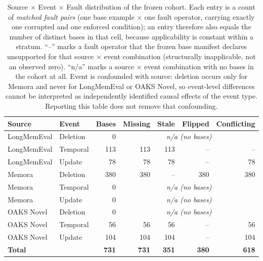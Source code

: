 \begin{table}[t]
\centering
\small
\caption{Source $\times$ Event $\times$ Fault distribution of the frozen
cohort. Each entry is a count of \emph{matched fault pairs} (one base example
$\times$ one fault operator, carrying exactly one corrupted and one enforced
condition); an entry therefore also equals the number of distinct bases in
that cell, because applicability is constant within a stratum. ``--'' marks a
fault operator that the frozen base manifest declares unsupported for that
source $\times$ event combination (structurally inapplicable, not an observed
zero). ``n/a'' marks a source $\times$ event combination with no bases in the
cohort at all. Event is confounded with source: deletion occurs only for
Memora and never for LongMemEval or OAKS Novel, so event-level differences
cannot be interpreted as independently identified causal effects of the event
type. Reporting this table does not remove that confounding.}
\label{tab:source-event-fault}
\begin{tabular}{llrrrrr}
\toprule
Source & Event & Bases & Missing & Stale & Flipped & Conflicting \\
\midrule
LongMemEval & Deletion & 0 & \multicolumn{4}{c}{\textit{n/a (no bases)}} \\
LongMemEval & Temporal & 113 & 113 & 113 & -- & -- \\
LongMemEval & Update & 78 & 78 & 78 & -- & 78 \\
\midrule
Memora & Deletion & 380 & 380 & -- & 380 & 380 \\
Memora & Temporal & 0 & \multicolumn{4}{c}{\textit{n/a (no bases)}} \\
Memora & Update & 0 & \multicolumn{4}{c}{\textit{n/a (no bases)}} \\
\midrule
OAKS Novel & Deletion & 0 & \multicolumn{4}{c}{\textit{n/a (no bases)}} \\
OAKS Novel & Temporal & 56 & 56 & 56 & -- & 56 \\
OAKS Novel & Update & 104 & 104 & 104 & -- & 104 \\
\midrule
\textbf{Total} & & \textbf{731} & \textbf{731} & \textbf{351} & \textbf{380} & \textbf{618} \\
\bottomrule
\end{tabular}
\end{table}
